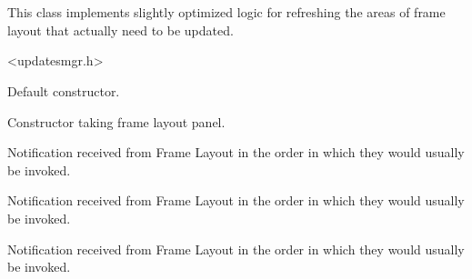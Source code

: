 %
%


\section{}\label{cbsimpleupdatesmgr}


This class implements slightly optimized logic for refreshing
the areas of frame layout that actually need to be updated.




<updatesmgr.h>




\label{cbsimpleupdatesmgrcbsimpleupdatesmgr}


Default constructor.



Constructor taking frame layout panel.


\label{cbsimpleupdatesmgronbarwillchange}


Notification received from Frame Layout in the order in which
they would usually be invoked.


\label{cbsimpleupdatesmgronfinishchanges}


Notification received from Frame Layout in the order in which
they would usually be invoked.


\label{cbsimpleupdatesmgronpanemarginswillchange}


Notification received from Frame Layout in the order in which
they would usually be invoked.


